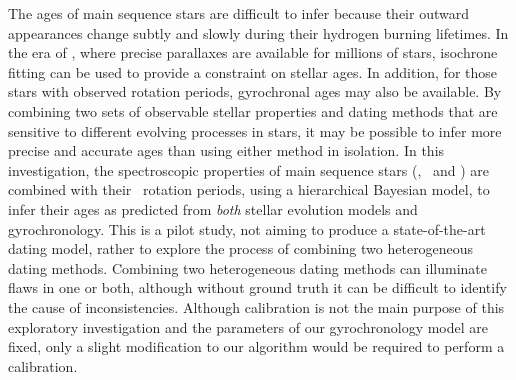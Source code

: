 
The ages of main sequence stars are difficult to infer because their outward
appearances change subtly and slowly during their hydrogen burning lifetimes.
In the era of \gaia, where precise parallaxes are available for millions of
stars, isochrone fitting can be used to provide a constraint on stellar ages.
In addition, for those stars with observed rotation periods, gyrochronal ages
may also be available.
By combining two sets of observable stellar properties and dating methods that
are sensitive to different evolving processes in stars, it may be possible to
infer more precise and accurate ages than using either method in isolation.
In this investigation, the spectroscopic properties of main sequence stars
(\teff, \feh\ and \logg) are combined with their \kepler\ rotation periods,
using a hierarchical Bayesian model, to infer their ages as predicted from {\it
both} stellar evolution models and gyrochronology.
This is a pilot study, not aiming to produce a state-of-the-art dating model,
rather to explore the process of combining two heterogeneous dating methods.
Combining two heterogeneous dating methods can illuminate flaws in one or
both, although without ground truth it can be difficult to identify the cause
of inconsistencies.
Although calibration is not the main purpose of this exploratory investigation
and the parameters of our gyrochronology model are fixed, only a slight
modification to our algorithm would be required to perform a calibration.




